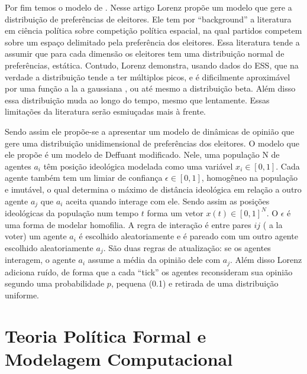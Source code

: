 Por fim temos o modelo de . Nesse artigo Lorenz
propõe um modelo que gere a distribuição de preferências de eleitores. Ele tem
por ``background'' a literatura em ciência política sobre competição política
espacial, na qual partidos competem sobre um espaço delimitado pela preferência
dos eleitores. Essa literatura tende a assumir que para cada dimensão os
eleitores tem uma distribuição normal de preferências, estática. Contudo, Lorenz
demonstra, usando dados do ESS, que na verdade a distribuição tende a
ter
múltiplos picos, e é dificilmente aproximável por uma função a la a gaussiana ,
ou até mesmo a distribuição beta. Além disso essa distribuição muda ao longo do
tempo, mesmo que lentamente. Essas limitações da literatura serão esmiuçadas
mais à frente.

Sendo assim ele propõe-se a apresentar um modelo de dinâmicas de opinião que
gere uma distribuição unidimensional de preferências dos eleitores. O modelo que
ele propõe é um modelo de Deffuant modificado. Nele, uma população N de agentes
$a_i$ têm posição ideológica modelada como uma variável $x_i \in [0,1]$. Cada
agente também tem um limiar de confiança $\epsilon \in [0,1]$, homogêneo na população e
imutável, o qual determina o máximo de distância ideológica em relação a outro
agente $a_j$ que $a_i$ aceita quando interage com ele. Sendo assim as posições
ideológicas da população num tempo $t$ forma um vetor $x(t) \in [0,1]^N$. O $\epsilon$ é
uma forma de modelar homofilia. A regra de interação é entre pares $ij$ ( a la
voter) um agente $a_i$ é escolhido aleatoriamente e é pareado com um outro
agente escolhido aleatoriamente $a_j$. São duas regras de atualização: se os
agentes interagem, o agente $a_i$ assume a média da opinião dele com $a_j$. Além
disso Lorenz adiciona ruído, de forma que a cada ``tick'' os agentes
reconsideram sua opinião segundo uma probabilidade $p$, pequena (0.1) e retirada
de uma distribuição uniforme.

\section{Teoria Política Formal e Modelagem Computacional}




